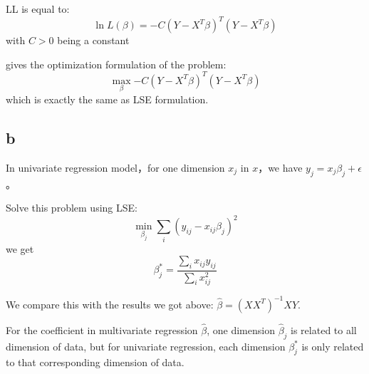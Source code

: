 \documentclass[a4paper]{article}
\begin{document}
\begin{CJK}{UTF8}{gbsn}
LL is equal to:
\begin{equation}
    \ln L(\beta)=-C (Y-X^T\beta)^T(Y-X^T\beta)
\end{equation}
with $C>0$ being a constant

gives the optimization formulation of the problem:
\begin{equation}
    \max_{\beta}{-C (Y-X^T\beta)^T(Y-X^T\beta)}
\end{equation}
which is exactly the same as LSE formulation.

\subsection{b} %
In univariate regression model，for one dimension $x_j$ in $x$，we have $y_j=x_j\beta_j+\epsilon$。

Solve this problem using LSE:
\begin{equation}
    \min_{\beta_j}{\sum_i{(y_{ij}-x_{ij}\beta_j)^2}}
\end{equation}
we get 
\begin{equation}
	\beta^*_j=\frac{\sum_i{x_{ij}y_{ij}}}{\sum_i{x_{ij}^2}}
\end{equation}

We compare this with the results we got above: $\hat{\beta}=(XX^T)^{-1}XY$. 

For the coefficient in multivariate regression $\hat{\beta}$, one dimension $\hat{\beta}_j$ is related to all dimension of data, but for univariate regression, each dimension $\beta^*_j$ is only related to that corresponding dimension of data. 

\end{CJK}
\end{document}
